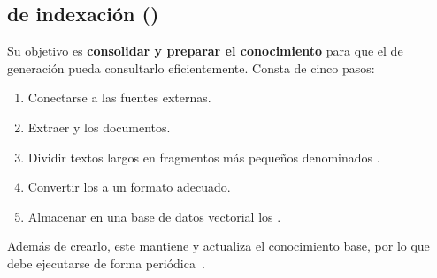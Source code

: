 \subsection{ de indexación ()}
Su objetivo es \textbf{consolidar y preparar el conocimiento} para que el  de generación pueda consultarlo eficientemente. Consta de cinco pasos:
\begin{enumerate}
\tightlist
	\item Conectarse a las fuentes externas.
	\item Extraer y  los documentos.
	\item Dividir textos largos en fragmentos más pequeños denominados .
	\item Convertir los  a un formato adecuado.
	\item Almacenar en una base de datos vectorial los .
\end{enumerate}
Además de crearlo, este  mantiene y actualiza el conocimiento base, por lo que debe ejecutarse de forma periódica~\cite{book:RAG_SimpleGuide}.

